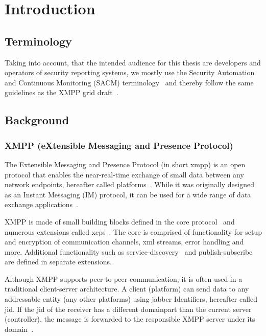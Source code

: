 \newcommand{\code}{\texttt}
\chapter{Introduction}
\label{sec:introduction}

\section{Terminology}

Taking into account, that the intended audience for this thesis are developers and operators of security reporting systems, 
we mostly use the  Security Automation and Continuous Monitoring (SACM) terminology~\cite{ietf-sacm-terminology-14}
and thereby follow the same guidelines as the XMPP grid draft~\cite{ietf-mile-xmpp-grid-05}.

\section{Background}

\subsection{XMPP (eXtensible Messaging and Presence Protocol)}
The Extensible Messaging and Presence Protocol (in short \gls{xmpp}) is an open protocol that enables the near-real-time exchange of small data between any network endpoints, hereafter called \glspl{platform}~\cite{rfc6120}.
While it was originally designed as an Instant Messaging (IM) protocol, it can be used for a wide range of data exchange applications~\cite{ieee-xplore-stream-xml-xmpp}.

XMPP is made of small building blocks defined in the core protocol~\cite{rfc6120} and numerous extensions called \glspl{xep}~\cite{xep-0001}.
The core is comprised of functionality for setup and encryption of communication channels, \gls{xml} streams, error handling and more. Additional functionality such as \gls{service-discovery}~\cite{xep-0030} and \gls{publish-subscribe}~\cite{xep-0060} are defined in separate extensions.

Although XMPP supports peer-to-peer communication, it is often used in a traditional client-server architecture.
A client (\gls{platform}) can send data to any addressable entity (any other \glspl{platform}) using \Gls{jabber} Identifiers, hereafter called \gls{jid}. If the \gls{jid} of the receiver has a different domainpart than the current server (\gls{controller}), the message is forwarded to the responsible XMPP server under its domain~\cite{rfc6120}.

